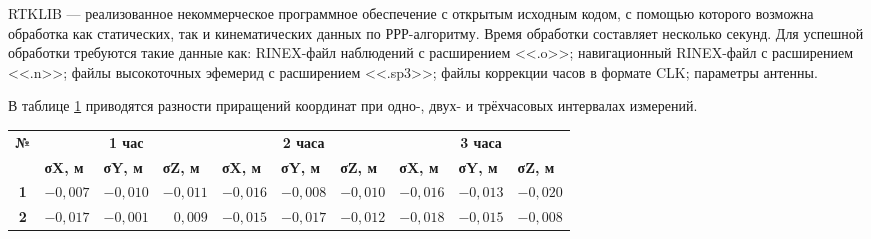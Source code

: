 RTKLIB --- реализованное некоммерческое программное обеспечение с открытым исходным кодом, с помощью которого возможна обработка как статических, так и кинематических данных по РРР-алгоритму. Время обработки составляет несколько секунд. Для успешной обработки требуются такие данные как: RINEX-файл наблюдений с расширением <<.o>>; навигационный RINEX-файл с расширением <<.n>>; файлы высокоточных эфемерид с расширением <<.sp3>>; файлы коррекции часов в формате CLK; параметры антенны.

В таблице \cref{tab:tab13} приводятся разности приращений координат при одно-, двух- и трёхчасовых интервалах измерений.


\begin{table} [htbp]
	\centering\small
	\label{tab:tab13}{%
		\begin{tabular}{|c|rrr|rrr|rrr|}
			\hline
			\multirow{2}{*}{\textbf{№}} & 
			\multicolumn{3}{c|}{\textbf{1 час}}                                                                             & \multicolumn{3}{c|}{\textbf{2 часа}}                                                                            & \multicolumn{3}{c|}{\textbf{3 часа}}                                                                            \\ \cline{2-10} 
			& \multicolumn{1}{l|}{\textbf{σX, м}} & \multicolumn{1}{l|}{\textbf{σY, м}} & \multicolumn{1}{l|}{\textbf{σZ, м}} & \multicolumn{1}{l|}{\textbf{σX, м}} & \multicolumn{1}{l|}{\textbf{σY, м}} & \multicolumn{1}{l|}{\textbf{σZ, м}} & \multicolumn{1}{l|}{\textbf{σX, м}} & \multicolumn{1}{l|}{\textbf{σY, м}} & \multicolumn{1}{l|}{\textbf{σZ, м}} \\ \hline
			\textbf{1}                  		& 
			\multicolumn{1}{r|}{$-0,007$}       & \multicolumn{1}{r|}{$-0,010$}       & $-0,011$                            & \multicolumn{1}{r|}{$-0,016$}       & \multicolumn{1}{r|}{$-0,008$}       & $-0,010$                            & \multicolumn{1}{r|}{$-0,016$}       & \multicolumn{1}{r|}{$-0,013$}       & $-0,020$                            \\ \hline
			\textbf{2}                  		& 
			\multicolumn{1}{r|}{$-0,017$}       & \multicolumn{1}{r|}{$-0,001$}       & $ 0,009$                            & \multicolumn{1}{r|}{$-0,015$}       & \multicolumn{1}{r|}{$-0,017$}       & $-0,012$                            & \multicolumn{1}{r|}{$-0,018$}       & \multicolumn{1}{r|}{$-0,015$}       & $-0,008$                            \\ \hline

\end{tabular}}
\end{table}
